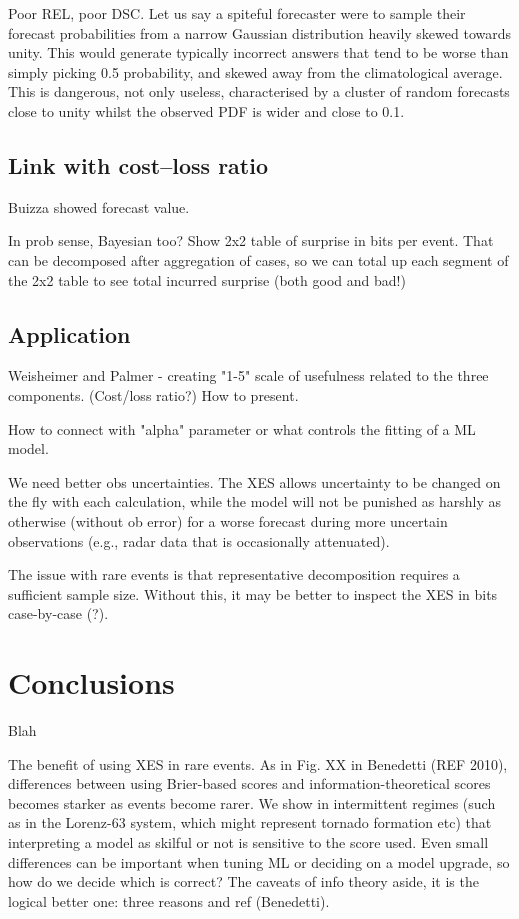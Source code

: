 \documentclass[draft]{ametsoc}
\begin{document}
Poor REL, poor DSC. Let us say a spiteful forecaster were to sample their forecast probabilities from a narrow Gaussian distribution heavily skewed towards unity. This would generate typically incorrect answers that tend to be worse than simply picking 0.5 probability, and skewed away from the climatological average. This is dangerous, not only useless, characterised by a cluster of random forecasts close to unity whilst the observed PDF is wider and close to 0.1.

\subsection{Link with cost--loss ratio}
Buizza showed forecast value.

In prob sense, Bayesian too? Show 2x2 table of surprise in bits per event. That can be decomposed after aggregation of cases, so we can total up each segment of the 2x2 table to see total incurred surprise (both good and bad!)

\subsection{Application}
Weisheimer and Palmer - creating "1-5" scale of usefulness related to the three components. (Cost/loss ratio?) How to present. 

How to connect with "alpha" parameter or what controls the fitting of a ML model.

We need better obs uncertainties. The XES allows uncertainty to be changed on the fly with each calculation, while the model will not be punished as harshly as otherwise (without ob error) for a worse forecast during more uncertain observations (e.g., radar data that is occasionally attenuated).

The issue with rare events is that representative decomposition requires a sufficient sample size. Without this, it may be better to inspect the XES in bits case-by-case (?).

\section{Conclusions}
Blah

The benefit of using XES in rare events. As in Fig. XX in Benedetti (REF 2010), differences between using Brier-based scores and information-theoretical scores becomes starker as events become rarer. We show in intermittent regimes (such as in the Lorenz-63 system, which might represent tornado formation etc) that interpreting a model as skilful or not is sensitive to the score used. Even small differences can be important when tuning ML or deciding on a model upgrade, so how do we decide which is correct? The caveats of info theory aside, it is the logical better one: three reasons and ref (Benedetti).
\end{document}
